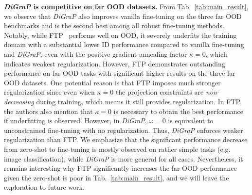 \noindent \textbf{\emph{DiGraP} is competitive on far OOD datasets.} From Tab.~\ref{tab:main_result}, we observe that \emph{DiGraP} also improves vanilla fine-tuning on the three far OOD benchmarks and is the second best among all robust fine-tuning methods. Notably, while FTP~\citep{tian_trainable_2023} performs well on OOD, it severely underfits the training domain with a substantial lower ID performance compared to vanilla fine-tuning and \emph{DiGraP}, even with the positive gradient annealing factor $\kappa=0$, which indicates weakest regularization. However, FTP demonstrates outstanding performance on far OOD tasks with significant higher results on the three far OOD datasets. One potential reason is that FTP imposes much stronger regularization since even when $\kappa=0$ the projection constraints are \textit{non-decreasing} during training, which means it still provides regularization. In FTP, the authors also mention that $\kappa=0$ is necessary to obtain the best performance if underfitting is observed. However, in \emph{DiGraP}, $\omega=0$ is equivalent to unconstrained fine-tuning with no regularization. Thus, \emph{DiGraP} enforces weaker regularization than FTP. We emphasize that the significant performance decrease from zero-shot to fine-tuning is mostly observed on rather simple tasks (e.g. image classification), while \emph{DiGraP} is more general for all cases. Nevertheless, it remains interesting why FTP significantly increases the far OOD performance given the zero-shot is poor in Tab.~\ref{tab:main_result}, and we will leave the exploration to future work.
